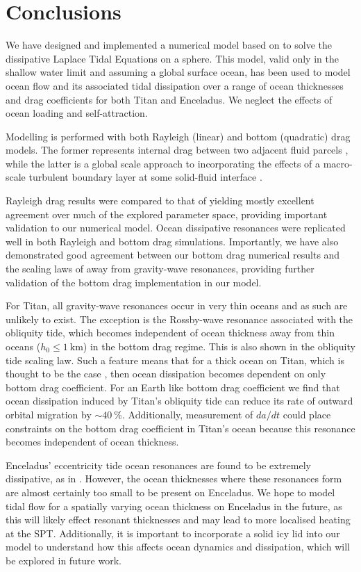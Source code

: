 \section{Conclusions}

We have designed and implemented a numerical model based on \citet{sears1995tidal} to solve the dissipative Laplace Tidal Equations on a sphere. This model, valid only in the shallow water limit and assuming a global surface ocean, has been used to model ocean flow and its associated tidal dissipation over a range of ocean thicknesses and drag coefficients for both Titan and Enceladus. We neglect the effects of ocean loading and self-attraction.

Modelling is performed with both Rayleigh (linear) and bottom (quadratic) drag models. The former represents internal drag between two adjacent fluid parcels \citep{neumann1968ocean}, while the latter is a global scale approach to incorporating the effects of a macro-scale turbulent boundary layer at some solid-fluid interface \citep{gill1982atmosphere}.

Rayleigh drag results were compared to that of \citet{matsuyama2014tidal} yielding mostly excellent agreement over much of the explored parameter space, providing important validation to our numerical model. Ocean dissipative resonances were replicated well in both Rayleigh and bottom drag simulations. Importantly, we have also demonstrated good agreement between our bottom drag numerical results and the scaling laws of \citet{chen2013tidal} away from gravity-wave resonances, providing further validation of the bottom drag implementation in our model.

For Titan, all gravity-wave resonances occur in very thin oceans and as such  are unlikely to exist. The exception is the Rossby-wave resonance associated with the obliquity tide, which becomes independent of ocean thickness away from thin oceans ($h_0 \leqslant\SI{1}{\kilo\metre}$) in the bottom drag regime. This is also shown in the \citet{chen2013tidal} obliquity tide scaling law. Such a feature means that for a thick ocean on Titan, which is thought to be the case \citep{sohl2014structural}, then ocean dissipation becomes dependent on only bottom drag coefficient. For an Earth like bottom drag coefficient we find that ocean dissipation induced by Titan's obliquity tide can reduce its rate of outward orbital migration by  $\sim\SI{40}{\percent}$. Additionally, measurement of $da/dt$ could place constraints on the bottom drag coefficient in Titan's ocean because this resonance becomes independent of ocean thickness. 

Enceladus' eccentricity tide ocean resonances are found to be extremely dissipative, as in \citet{tyler2011tidal, matsuyama2014tidal}. However, the ocean thicknesses where these resonances form are almost certainly too small to be present on Enceladus. We hope to model tidal flow for a spatially varying ocean thickness on Enceladus in the future, as this will likely effect resonant thicknesses and may lead to more localised heating at the SPT. Additionally, it is important to incorporate a solid icy lid into our model to understand how this affects ocean dynamics and dissipation, which will be explored in future work. 